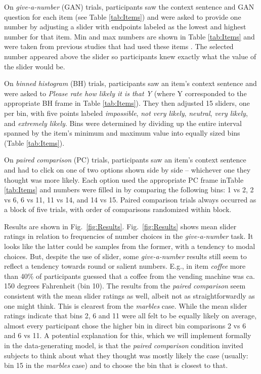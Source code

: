 \documentclass[10pt,letterpaper]{article}
\newcommand{\tableref}[1]{Table \ref{#1}}
\newcommand{\figref}[1]{Fig.~\ref{#1}}
\begin{document}
On \emph{give-a-number} (GAN) trials, participants saw the context sentence and GAN question
for each item (see \tableref{tab:Items}) and were asked to provide one number by adjusting a
slider with endpoints labeled as the lowest and highest number for that item. Min and max
numbers are shown in \tableref{tab:Items} and were taken from previous studies that had used
these items
\cite{DegenTessler2015:Wonky-worlds:-L,SchollerFranke2015:Semantic-values,KaoWu2014:Nonliteral-Unde}. The
selected number appeared above the slider so participants knew exactly what the value of the
slider would be.

On \emph{binned histogram} (BH) trials, participants saw an item's context sentence and were
asked to \emph{Please rate how likely it is that Y} (where Y corresponded to the appropriate BH
frame in \tableref{tab:Items}). They then adjusted 15 sliders, one per bin, with five points
labeled \emph{impossible}, \emph{not very likely}, \emph{neutral}, \emph{very likely}, and
\emph{extremely likely}. Bins were determined by dividing up the entire interval spanned by the
item's minimum and maximum value into equally sized bins (\tableref{tab:Items}).

On \emph{paired comparison} (PC) trials, participants saw an item's context sentence and had to
click on one of two options shown side by side -- whichever one they thought was more likely.
Each option used the appropriate PC frame in\tableref{tab:Items} and numbers were filled in by
comparing the following bins: 1 vs 2, 2 vs 6, 6 vs 11, 11 vs 14, and 14 vs 15. Paired
comparison trials always occurred as a block of five trials, with order of comparisons
randomized within block.

Results are shown in \figref{fig:Results}. \figref{fig:Results} shows mean slider ratings in
relation to frequencies of number choices in the \emph{give-a-number} task. It looks like the
latter could be samples from the former, with a tendency to modal choices. But, despite the use
of slider, some \emph{give-a-number} results still seem to reflect a tendency towards round or
salient numbers. E.g., in item \emph{coffee} more than 40\% of participants guessed that a
coffee from the vending machine was ca. 150 degrees Fahrenheit (bin 10). The results from the
\emph{paired comparison} seem consistent with the mean slider ratings as well, albeit not as
straightforwardly as one might think. This is clearest from the \emph{marbles} case. While the
mean slider ratings indicate that bins 2, 6 and 11 were all felt to be equally likely on
average, almost every participant chose the higher bin in direct bin comparisons 2 vs 6 and 6
vs 11. A potential explanation for this, which we will implement formally in the
data-generating model, is that the \emph{paired comparison} condition invited subjects to think
about what they thought was mostly likely the case (usually: bin 15 in the
\emph{marbles} case) and to choose the bin that is closest to that.
\end{document}
